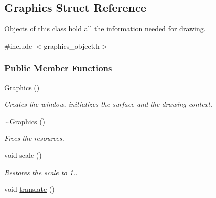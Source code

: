 \hypertarget{structGraphics}{}\subsection{Graphics Struct Reference}
\label{structGraphics}


Objects of this class hold all the information needed for drawing.  




{\ttfamily \#include $<$graphics\+\_\+object.\+h$>$}

\subsubsection*{Public Member Functions}
\begin{DoxyCompactItemize}
\item 
\hyperlink{structGraphics_af2e8fe67fd31ec263c843a6e28b29d3c}{Graphics} ()\hypertarget{structGraphics_af2e8fe67fd31ec263c843a6e28b29d3c}{}\label{structGraphics_af2e8fe67fd31ec263c843a6e28b29d3c}

\begin{DoxyCompactList}\small\item\em Creates the window, initializes the surface and the drawing context. \end{DoxyCompactList}\item 
\hyperlink{structGraphics_a7841c9a961ac9bca33bd30ddf8066cdb}{$\sim$\+Graphics} ()\hypertarget{structGraphics_a7841c9a961ac9bca33bd30ddf8066cdb}{}\label{structGraphics_a7841c9a961ac9bca33bd30ddf8066cdb}

\begin{DoxyCompactList}\small\item\em Frees the resources. \end{DoxyCompactList}\item 
void \hyperlink{structGraphics_aa467e53017741e5e964d58c2c43ea54e}{scale} ()\hypertarget{structGraphics_aa467e53017741e5e964d58c2c43ea54e}{}\label{structGraphics_aa467e53017741e5e964d58c2c43ea54e}

\begin{DoxyCompactList}\small\item\em Restores the scale to 1.. \end{DoxyCompactList}\item 
void \hyperlink{structGraphics_a94e4fc92cbc56d3b5deaf8a08e791b8d}{translate} ()\hypertarget{structGraphics_a94e4fc92cbc56d3b5deaf8a08e791b8d}{}\label{structGraphics_a94e4fc92cbc56d3b5deaf8a08e791b8d}


\end{DoxyCompactItemize}
